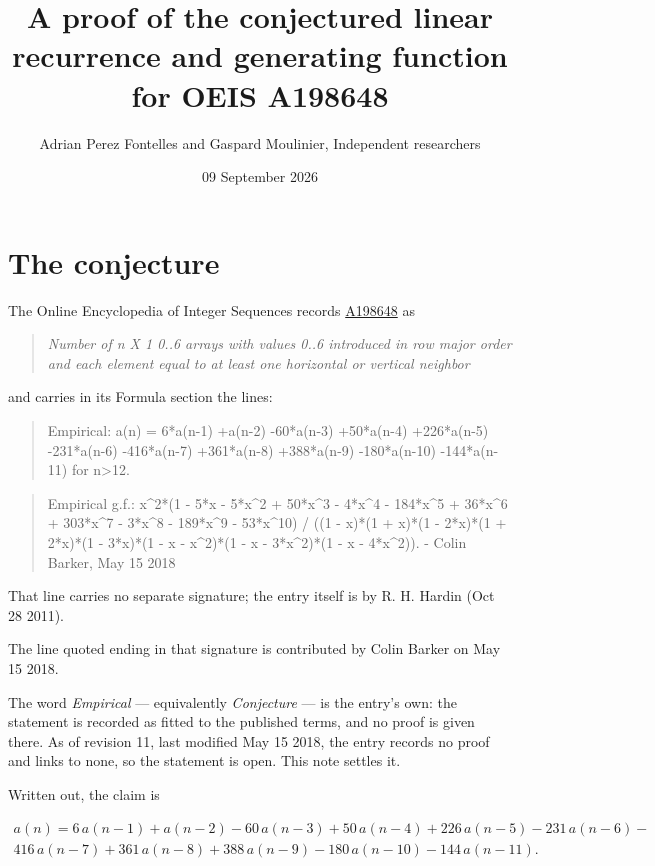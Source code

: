 \documentclass[11pt]{article}
\title{A proof of the conjectured linear recurrence and generating function for OEIS A198648}
\author{Adrian Perez Fontelles and Gaspard Moulinier, Independent researchers}
\date{09 September 2026}
\theoremstyle{definition}
\begin{document}
\maketitle
\section{The conjecture}

The Online Encyclopedia of Integer Sequences records \href{https://oeis.org/A198648}{A198648} as

\begin{quote}\itshape Number of n X 1 0..6 arrays with values 0..6 introduced in row major order and each element equal to at least one horizontal or vertical neighbor\end{quote}

and carries in its Formula section the lines:

\begin{quote}\ttfamily Empirical: a(n) = 6*a(n-1) +a(n-2) -60*a(n-3) +50*a(n-4) +226*a(n-5) -231*a(n-6) -416*a(n-7) +361*a(n-8) +388*a(n-9) -180*a(n-10) -144*a(n-11) for n>12.\end{quote}

\begin{quote}\ttfamily Empirical g.f.: x\textasciicircum{}2*(1 - 5*x - 5*x\textasciicircum{}2 + 50*x\textasciicircum{}3 - 4*x\textasciicircum{}4 - 184*x\textasciicircum{}5 + 36*x\textasciicircum{}6 + 303*x\textasciicircum{}7 - 3*x\textasciicircum{}8 - 189*x\textasciicircum{}9 - 53*x\textasciicircum{}10) / ((1 - x)*(1 + x)*(1 - 2*x)*(1 + 2*x)*(1 - 3*x)*(1 - x - x\textasciicircum{}2)*(1 - x - 3*x\textasciicircum{}2)*(1 - x - 4*x\textasciicircum{}2)). - Colin Barker, May 15 2018\end{quote}

That line carries no separate signature; the entry itself is by R. H. Hardin (Oct 28 2011).

The line quoted ending in that signature is contributed by Colin Barker on May 15 2018.

The word {\itshape Empirical} --- equivalently {\itshape Conjecture} --- is the entry's own: the statement is recorded as fitted to the published terms, and no proof is given there. As of revision 11, last modified May 15 2018, the entry records no proof and links to none, so the statement is open. This note settles it.

Written out, the claim is

\begin{multline*} a(n) = 6\,a(n-1) + a(n-2) - 60\,a(n-3) + 50\,a(n-4) + 226\,a(n-5) - 231\,a(n-6) - \\ 416\,a(n-7) + 361\,a(n-8) + 388\,a(n-9) - 180\,a(n-10) - 144\,a(n-11). \end{multline*}
\end{document}
